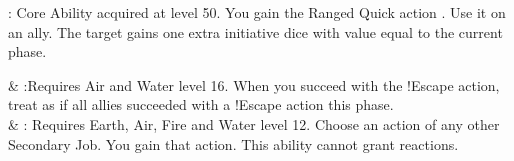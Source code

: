 \begin{ffminipage}
\noindent{}: Core Ability acquired at level 50. You gain the Ranged Quick action . Use it on an ally. The target gains one extra initiative dice with value equal to the current phase. 

\begin{jobchoice}
  & %
:Requires Air and Water level 16. When you succeed with the !Escape action, treat as if all allies succeeded with a !Escape action this phase. \\
    & %
: Requires Earth, Air, Fire and Water level 12. Choose an action of any other Secondary Job.  You gain that action. This ability cannot grant reactions. \\
\end{jobchoice}
\end{ffminipage}